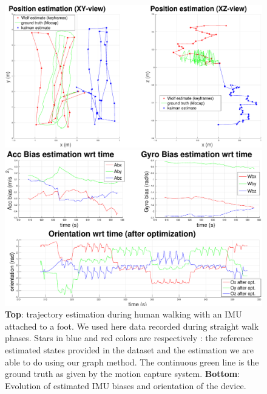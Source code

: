 \begin{figure}[tb]
\centering
\includegraphics[scale=0.182]{figures/experiments/straight_walk/XY_XZ_viewsRotated.eps}
\par\vspace{4mm}
\includegraphics[scale=0.182]{figures/experiments/straight_walk/bias_orientation.eps}
\caption{ 
{\bf Top}: trajectory estimation during human walking with an IMU attached to a foot. We used here data recorded during straight walk phases. Stars in blue and red colors are respectively : the reference estimated states provided in the dataset and the estimation we are able to do using our graph method.
The continuous green line is the ground truth as given by the motion capture system.
{\bf Bottom}: Evolution of estimated IMU biases and orientation of the device.
}
\label{fig:straight_walk}
\end{figure}





